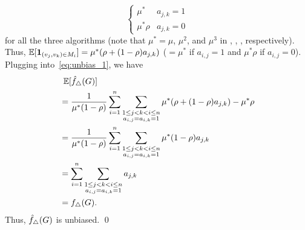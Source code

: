 {\[\begin{cases}
    \mu^* & a_{j,k} = 1 \\
    \mu^*\rho & a_{j,k} = 0
  \end{cases}
\]
for all the three algorithms (note that $\mu^* = \mu$, $\mu^2$, and $\mu^3$ in \AlgOne{}, \AlgTwo{}, \AlgThree{}, respectively).
Thus, $\operatorname{\mathbb{E}}[\textbf{1}_{(v_j, v_k) \in M_i}] = \mu^* (\rho + (1-\rho) a_{j,k})$
($= \mu^*$ if $a_{i,j}=1$ and $\mu^* \rho$ if $a_{i,j}=0$).
Plugging into~\eqref{eq:unbias_1}, we have
\begin{align*}
  &\;\operatorname{\mathbb{E}}[\hat{f}_\triangle(G)] \\
  &=
  \frac{1}{\mu^*(1-\rho)}\sum_{i=1}^n \sum_{\substack{1 \leq j < k < i \leq n \\ a_{i,j} = a_{i,k} =
  1}} \mu^*(\rho + (1-\rho)a_{j,k}) - \mu^* \rho \\
  &= \frac{1}{\mu^*(1-\rho)}\sum_{i=1}^n \sum_{\substack{1 \leq j < k < i \leq n \\ a_{i,j} = a_{i,k} =
  1}} \mu^*(1-\rho)a_{j,k} \\
  &= \sum_{i=1}^n \sum_{\substack{1 \leq j < k < i \leq n \\ a_{i,j} = a_{i,k} =
  1}} a_{j,k} \\
  &= f_\triangle(G).
\end{align*} 
Thus, $\hat{f}_\triangle(G)$ is unbiased. \qed

}
